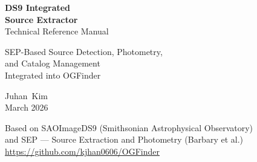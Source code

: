 \documentclass[11pt,fleqn]{book}
\begin{document}
\begin{titlepage}

\vspace*{1cm}

\begin{center}
{\fontsize{38}{46}\selectfont\sffamily\bfseries\color{white}DS9 Integrated}\\[0.5cm]
{\fontsize{38}{46}\selectfont\sffamily\bfseries\color{white}Source Extractor}\\[1cm]
{\fontsize{20}{24}\selectfont\sffamily\color{white!80}Technical Reference Manual}
\end{center}

\vspace{5cm}

\begin{center}
{\Large\sffamily
SEP-Based Source Detection, Photometry,\\[8pt]
and Catalog Management\\[8pt]
Integrated into OGFinder}

\vspace{3cm}

{\large\sffamily Juhan~Kim}\\[0.5cm]
{\sffamily March 2026}
\end{center}

\vfill

\begin{center}
{\small\sffamily
Based on SAOImageDS9 (Smithsonian Astrophysical Observatory)\\[3pt]
and SEP --- Source Extraction and Photometry (Barbary et al.)\\[6pt]
\url{https://github.com/kjhan0606/OGFinder}}
\end{center}
\vspace{1cm}
\end{titlepage}

\end{document}
